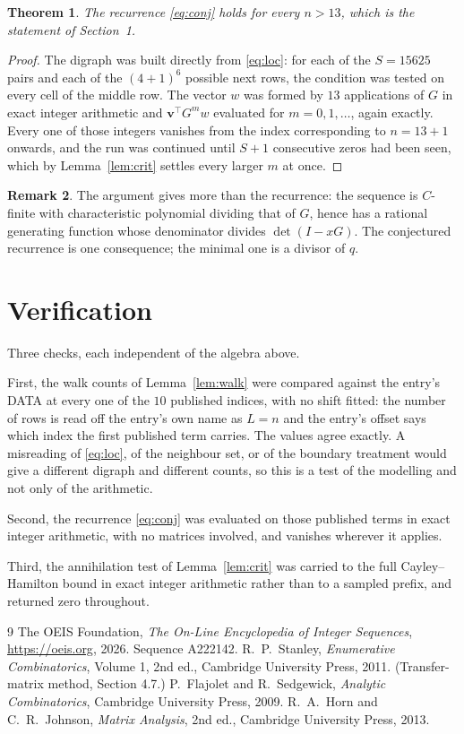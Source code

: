 \documentclass[11pt,a4paper]{article}
\theoremstyle{plain}
\newtheorem{theorem}{Theorem}
\theoremstyle{definition}
\newtheorem{remark}[theorem]{Remark}
\begin{document}
\begin{theorem}
The recurrence \eqref{eq:conj} holds for every $n>13$, which is the statement of
Section~1.
\end{theorem}

\begin{proof}
The digraph was built directly from \eqref{eq:loc}: for each of the $S=15625$ pairs and each
of the $(4+1)^{6}$ possible next rows, the condition was tested on every cell of
the middle row. The vector $w$ was formed by $13$ applications of $G$ in exact integer
arithmetic and $\mathbf{v}^{\!\top}G^{m}w$ evaluated for $m=0,1,\dots$, again exactly.
Every one of those integers vanishes from the index corresponding to $n=13+1$ onwards,
and the run was continued until $S+1$ consecutive zeros had been seen, which by
Lemma~\ref{lem:crit} settles every larger $m$ at once.
\end{proof}

\begin{remark}
The argument gives more than the recurrence: the sequence is $C$-finite with characteristic
polynomial dividing that of $G$, hence has a rational generating function whose denominator
divides $\det(I-xG)$. The conjectured recurrence is one consequence; the minimal one is a
divisor of $q$.
\end{remark}

\section{Verification}

Three checks, each independent of the algebra above.

First, the walk counts of Lemma~\ref{lem:walk} were compared against the entry's DATA at
every one of the $10$ published indices, with no shift fitted: the number of rows is
read off the entry's own name as $L=n$ and the entry's offset says which index the first
published term carries. The values agree exactly. A misreading of \eqref{eq:loc}, of the
neighbour set, or of the boundary treatment would give a different digraph and different
counts, so this is a test of the modelling and not only of the arithmetic.

Second, the recurrence \eqref{eq:conj} was evaluated on those published terms in exact
integer arithmetic, with no matrices involved, and vanishes wherever it applies.

Third, the annihilation test of Lemma~\ref{lem:crit} was carried to the full
Cayley--Hamilton bound in exact integer arithmetic rather than to a sampled prefix, and
returned zero throughout.

\begin{thebibliography}{9}
 The OEIS Foundation, \emph{The On-Line Encyclopedia of Integer
Sequences}, \url{https://oeis.org}, 2026. Sequence A222142.
 R.~P.~Stanley, \emph{Enumerative Combinatorics}, Volume 1, 2nd ed.,
Cambridge University Press, 2011. (Transfer-matrix method, Section 4.7.)
 P.~Flajolet and R.~Sedgewick, \emph{Analytic Combinatorics}, Cambridge
University Press, 2009.
 R.~A.~Horn and C.~R.~Johnson, \emph{Matrix Analysis}, 2nd ed., Cambridge
University Press, 2013.
\end{thebibliography}
\end{document}
